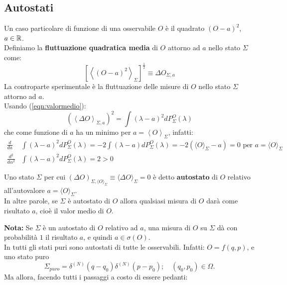 \documentclass[FisicaTeorica.tex]{subfiles}
\begin{document}
\subsection{Autostati}
Un caso particolare di funzione di una osservabile $O$ è il quadrato $\left(O-a\right)^2$, $a\in\mathbb{R}$.\\
Definiamo la \textbf{fluttuazione quadratica media} di $O$ attorno ad $a$ nello stato $\Sigma$ come:
\[
\left[\left\langle\left(O-a\right)^2\right\rangle_\Sigma\right]^{\frac{1}{2}}\equiv\Delta O_{\Sigma,a}
\]
La controparte sperimentale è la fluttuazione delle misure di $O$ nello stato $\Sigma$ attorno ad $a$.\\
Usando (\ref{eqn:valormedio}):
\begin{equation}
\left(\left\langle\Delta O\right\rangle_{\Sigma,a}\right)^2=\int\left(\lambda-a\right)^2 dP_\Sigma^O\left(\lambda\right)
\label{eqn:fluttuamedia}
\end{equation}
che come funzione di $a$ ha un minimo per $a=\left\langle O\right\rangle_\Sigma$, infatti:
\begin{align*}
    \frac{d}{da}&\int (\lambda-a)^2 dP_\Sigma^O(\lambda) = -2\int (\lambda-a)dP_\Sigma^O(\lambda) = -2(\langle O \rangle_\Sigma -a) = 0 \text{ per } a = \langle O \rangle_\Sigma \\
    \frac{d^2}{d\alpha^2}&\int\left(\lambda-a\right)^2 dP_\Sigma^O\left(\lambda\right) = 2 > 0
\end{align*}
\begin{dfn}
Uno stato  $\Sigma$ per cui $(\Delta O)_{\Sigma, \langle O \rangle_\Sigma} \equiv \langle \Delta O \rangle_\Sigma = 0$ è detto \textbf{autostato} di $O$ relativo all'autovalore $a = \langle O \rangle_\Sigma$.\\
In altre parole, se  $\Sigma$ è autostato di $O$ allora qualsiasi misura di $O$ darà come risultato $a$, cioè il valor medio di $O$.
\end{dfn}
\textbf{Nota:} Se $\Sigma$ è un autostato di $O$ relativo ad $a$, una misura di $O$ su $\Sigma$ dà con probabilità $1$ il risultato $a$, e quindi $a \in\sigma(O)$.\\
In \textbf{\MC} tutti gli stati puri sono autostati di tutte le osservabili. Infatti: $O=f(q,p)$, e uno stato puro 
\[ \Sigma_{puro}= \delta^{(N)}\left(q-q_0\right)\delta^{\left(N\right)}\left(p-p_0\right); \quad \left(q_0,p_0\right)\in\Omega.
\]
Ma allora, facendo tutti i passaggi a costo di essere pedanti: 
\end{document}
